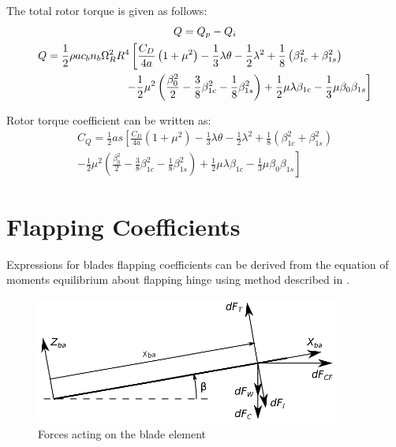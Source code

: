 The total rotor torque is given as follows: \cite{Bramwell2001, NASA-TT-F-494}
\begin{gather}
  Q = Q_p - Q_i \\
  \begin{multlined}[0.88\textwidth]
    Q = \frac{1}{2} \rho a c_b n_b \Omega_R^2 R^4
    \left[
      \frac{C_D}{4a} \left( 1 + \mu^2 \right)
      - \frac{1}{3} \lambda \theta
      - \frac{1}{2} \lambda^2
      + \frac{1}{8} \left( \beta_{1c}^2 + \beta_{1s}^2 \right)
      \right.
      \\
      \left.
      - \frac{1}{2} \mu^2
      \left(
        \frac{\beta_0^2}{2}
        - \frac{3}{8} \beta_{1c}^2
        - \frac{1}{8} \beta_{1s}^2
      \right)
      + \frac{1}{2} \mu \lambda \beta_{1c}
      - \frac{1}{3} \mu \beta_0 \beta_{1s}
    \right]
  \end{multlined}
\end{gather}

Rotor torque coefficient can be written as:
\begin{multline}
  C_Q = \frac{1}{2} a s
  \left[
    \frac{C_D}{4a} \left( 1 + \mu^2 \right)
    - \frac{1}{3} \lambda \theta
    - \frac{1}{2} \lambda^2
    + \frac{1}{8} \left( \beta_{1c}^2 + \beta_{1s}^2 \right)
    \right.
    \\
    \left.
    - \frac{1}{2} \mu^2
    \left(
      \frac{\beta_0^2}{2}
      - \frac{3}{8} \beta_{1c}^2
      - \frac{1}{8} \beta_{1s}^2
    \right)
    + \frac{1}{2} \mu \lambda \beta_{1c}
    - \frac{1}{3} \mu \beta_0 \beta_{1s}
  \right]
\end{multline}

\section{Flapping Coefficients}

Expressions for blades flapping coefficients can be derived from the equation of moments equilibrium about flapping hinge using method described in \cite{NASA-TT-F-494}.

\begin{figure}
  \centering
  \includegraphics[width=100mm]{images/blade_element_moments.eps}
  \caption{Forces acting on the blade element}
\end{figure}


